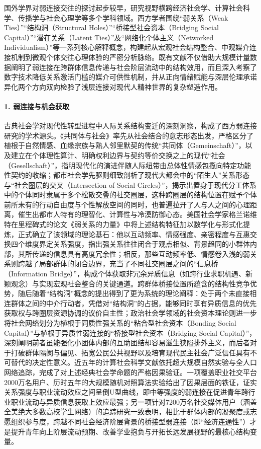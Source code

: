 国外学界对弱连接交往的探讨起步较早，研究视野横跨经济社会学、计算社会科学、传播学与社会心理学等多个学科领域。西方学者围绕“弱关系（Weak Ties）”“结构洞（Structural Holes）”“桥接型社会资本（Bridging Social Capital）”“潜在关系（Latent Ties）”及“网络化个体主义（Networked Individualism）”等一系列核心解释概念，构建起从宏观社会结构整合、中观媒介连接机制到微观个体交往心理体验的严密分析脉络。既有文献不仅借助大规模计量数据阐明了弱连接在跨群体信息传递与社会阶层流动中的结构效用，而且深入考察了数字技术降低关系激活门槛的媒介可供性机制，并从正向情绪赋能与深层伦理承诺异化两个方向双向检验了浅层连接对现代人精神世界的复杂塑造作用。

\paragraph{1. 弱连接与机会获取}
古典社会学对现代性转型进程中人际关系结构变迁的深刻洞察，构成了西方弱连接研究的学术源头。《共同体与社会》率先从社会结合的意志形态出发，严格区分了植根于自然情感、血缘宗族与熟人邻里默契的传统“共同体（Gemeinschaft）”，以及建立在个体理性算计、明确权利边界与契约等价交换之上的现代“社会（Gesellschaft）”，指明现代化的演进伴随人际纽带由总体性情感包揽向特定功能性契约的收缩\cite{Tonnies2019}；都市社会学先驱则细致剖析了现代大都会中的“陌生人”关系形态与“社会圈层的交叉（Intersection of Social Circles）”，揭示出置身于现代分工体系中的个体同时隶属于多个松散交叠的社交圈层，这种跨圈层的结构位置在赋予个体前所未有的行动自由度与个性解放空间的同时，也普遍拉开了人与人之间的心理距离，催生出都市人特有的理智化、计算性与冷漠防御心态\cite{Simmel2002}。美国社会学家格兰诺维特在里程碑式的论文《弱关系的力量》中将上述结构特征加以数学化与形式化提炼，正式确立了该领域的理论基石：他以互动频率、情感强度、亲密程度与互惠交换四个维度界定关系强度，指出强关系往往闭合于观点相似、背景趋同的小群体内部，其所传递的信息具有高度冗余性；相反，那些互动频率低、情感卷入浅的弱关系则跨越了局部群体的闭合边界，充当了不同社交圈层之间的“信息桥（Information Bridge）”，构成个体获取非冗余异质信息（如跨行业求职机遇、新颖观念）与实现宏观社会整合的关键通道\cite{Granovetter1973}。跨群体桥接位置所蕴含的结构性竞争优势，随后随着“结构洞”概念的提出得到了更为系统的理论阐释：处于两个未直接相连群体之间的中介行动者，凭借对“结构洞”的占据，能够同时享有异质信息的优先获取权与跨圈层资源协调的议价自主性\cite{Burt1992}；政治社会学领域的社会资本理论则进一步将社会网络划分为植根于同质性强关系的“粘合型社会资本（Bonding Social Capital）”与植根于异质性弱连接的“桥接型社会资本（Bridging Social Capital）”，深刻阐明前者虽能强化小团体内部的互助团结却容易滋生狭隘排外主义，而后者对于打破群体隔阂与偏见、拓宽公民公共视野以及培育现代民主社会广泛信任具有不可替代的决定性意义\cite{Putnam2000}。近五年的计算社会科学文献依托超大规模自然实验与全人口网络追踪，完成了对上述经典社会学命题的严格因果验证。一项覆盖职业社交平台2000万名用户、历时五年的大规模随机对照算法实验给出了因果层面的铁证，证实关系强度与职业流动效应之间呈倒U型曲线，即中等强度的弱连接在促进青年跨行业职业流动与异质信息获取上效应最强\cite{Rajkumar2022}；另一项针对7200万名社交媒体用户（涵盖全美绝大多数高校学生网络）的追踪研究一致表明，相比于群体内部的凝聚度或志愿组织参与度，跨越不同社会经济阶层背景的桥接型弱连接（即“经济连通性”）才是提升青年向上阶层流动预期、改善学业抱负与开拓长远发展视野的最核心结构变量\cite{Chetty2022}。

